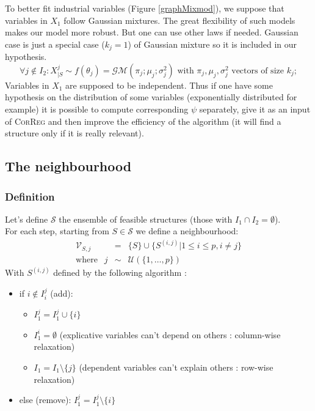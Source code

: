 \documentclass[11pt,a4paper]{article}
\begin{document}
	To better fit industrial variables (Figure \ref{graphMixmod}), we suppose  that variables in $X_1$ follow Gaussian mixtures. The great flexibility \cite{mclachlan2004finite} of such models makes our model more robust. But one can use other laws if needed. Gaussian case is just a special case ($k_j=1$) of Gaussian mixture so it is included in our hypothesis.
\begin{equation}
			\forall j \notin I_2 : X^j_{|S} \sim f(\theta_j)=\mathcal{GM}(\pi_j;\mu_j;\sigma^2_j) \textrm{ with } \pi_j,\mu_j,\sigma^2_j \textrm{ vectors of size } k_j; \label{mixtureX1}
		\end{equation}
		Variables in $X_1$ are supposed to be independent.
	Thus if one have some hypothesis on the distribution of some variables (exponentially distributed for example) it is possible to compute corresponding $\psi$ separately, give it as an input of \textsc{CorReg} and then improve the efficiency of the algorithm (it will find a structure only if it is really relevant).
		
	\subsection{The neighbourhood}
		\subsubsection{Definition}
	Let's define $\mathcal{S}$ the ensemble of feasible structures (those with $I_1\cap I_2=\emptyset$).
	\\
	For each step, starting from $S \in \mathcal{S}$ we define a neighbourhood:
		\begin{eqnarray}
		\mathcal{V}_{S,j}&=& \{S \}\cup \{ S^{(i,j)} |1\leq i \leq p, i\neq j  \} \\
		\textrm{where }\ \ j &\sim & \mathcal{U}(\{1,\dots,p\}) 
	\end{eqnarray}	
	With $S^{(i,j)}$ defined by the following algorithm :
	\begin{itemize}
		\item if $i \notin I_i^j$ (add): 
			\begin{itemize}
				\item $I_1^j=I_1^j\cup \{i\}$
				\item $I_1^i=\emptyset$ (explicative variables can't depend on others : column-wise relaxation)
				\item $I_1=I_1 \setminus \{j\}$ (dependent variables can't explain others : row-wise relaxation) 
			\end{itemize}			 
		\item else (remove): $I_1^j=I_1^j\setminus \{i\}$
	\end{itemize}
	
\end{document}
